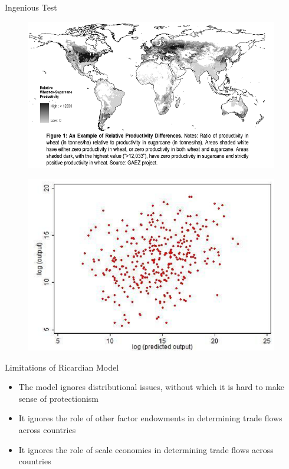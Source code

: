 \documentclass[10pt,hyperref={CJKbookmarks=true},xcolor=dvipsnames,aspectratio=169]{beamer}
\begin{document}
\begin{frame}{Ingenious Test }


\begin{figure}


\centering{}\includegraphics[width=11cm]{fig/ricardo/lec3-23}
\end{figure}

\end{frame}

\begin{frame}{}


\begin{figure}


\begin{centering}
\includegraphics[width=11cm]{fig/ricardo/lec3-24}
\par\end{centering}

\end{figure}

\end{frame}

\begin{frame}{Limitations of Ricardian Model}

\begin{itemize}
\item The model ignores distributional issues, without which it is hard
to make sense of protectionism 
\item It ignores the role of other factor endowments in determining trade
flows across countries 
\item It ignores the role of scale economies in determining trade flows
across countries 
\end{itemize}
\end{frame}
\end{document}
